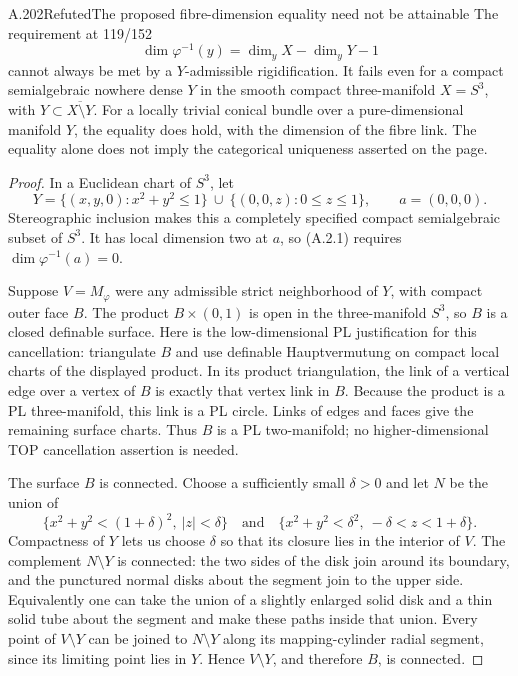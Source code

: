 \begin{saresult}{A.202}{Refuted}{The proposed fibre-dimension equality need not be attainable}
The requirement at 119/152
\[
 \dim\varphi^{-1}(y)=\dim_yX-\dim_yY-1
 \tag{A.2.1}
\]
cannot always be met by a $Y$-admissible rigidification. It fails even
for a compact semialgebraic nowhere dense $Y$ in the smooth compact
three-manifold $X=S^3$, with $Y\subset\overline{X\setminus Y}$.
For a locally trivial conical bundle over a pure-dimensional manifold
$Y$, the equality does hold, with the dimension of the fibre link.
The equality alone does not imply the categorical uniqueness asserted
on the page.
\end{saresult}
\begin{proof}
In a Euclidean chart of $S^3$, let
\[
 Y=\{(x,y,0):x^2+y^2\le1\}
 \ \cup\ \{(0,0,z):0\le z\le1\},\qquad a=(0,0,0).
\]
Stereographic inclusion makes this a completely specified compact
semialgebraic subset of $S^3$. It has local dimension two at $a$,
so (A.2.1) requires $\dim\varphi^{-1}(a)=0$.

Suppose $V=M_\varphi$ were any admissible strict neighborhood of $Y$,
with compact outer face $B$. The product $B\times(0,1)$ is open in
the three-manifold $S^3$, so $B$ is a closed definable surface.
Here is the low-dimensional PL justification for this cancellation:
triangulate $B$ and use definable Hauptvermutung on compact local
charts of the displayed product. In its product triangulation, the
link of a vertical edge over a vertex of $B$ is exactly that vertex
link in $B$. Because the product is a PL three-manifold, this link
is a PL circle. Links of edges and faces give the remaining surface
charts. Thus $B$ is a PL two-manifold; no higher-dimensional TOP
cancellation assertion is needed.

The surface $B$ is connected. Choose a sufficiently small $\delta>0$
and let $N$ be the union of
\[
 \{x^2+y^2<(1+\delta)^2,\ |z|<\delta\}
 \quad\text{and}\quad
 \{x^2+y^2<\delta^2,\ -\delta<z<1+\delta\}.
\]
Compactness of $Y$ lets us choose $\delta$ so that its closure lies
in the interior of $V$. The complement $N\setminus Y$ is connected:
the two sides of the disk join around its boundary, and the punctured
normal disks about the segment join to the upper side. Equivalently
one can take the union of a slightly enlarged solid disk and a thin
solid tube about the segment and make these paths inside that union.
Every point of $V\setminus Y$ can be joined to $N\setminus Y$ along
its mapping-cylinder radial segment, since its limiting point lies
in $Y$. Hence $V\setminus Y$, and therefore $B$, is connected.


\end{proof}

